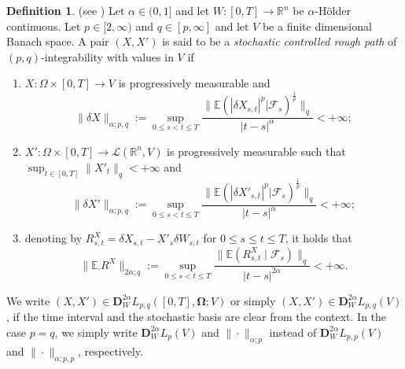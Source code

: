 \documentclass[10pt, a4paper]{article} %
\newcommand{\R}{\mathbb{R}}
\newcommand{\E}{\mathbb{E}}
\theoremstyle{definition}
\newtheorem{defn}{Definition}[section]
\theoremstyle{plain}
\begin{document}
\begin{defn} \label{def:stochasticcontrolledroughpath}
    (see \cite[Definition 3.1]{FHL21})
    Let $\alpha \in (0,1]$ and let $W:[0,T] \to \R^n$ be $\alpha$-H\"older continuous. Let $p \in [2,\infty)$ and $q \in [p,\infty]$ and let $V$ be a finite dimensional Banach space. A pair $(X,X')$ is said to be a \textit{stochastic controlled rough path} of $(p,q)$-integrability with values in $V$ if 
\begin{enumerate} \renewcommand{\labelenumi}{\roman{enumi})}
    \item $X:\Omega \times [0,T] \to V$ is progressively measurable and 
    \begin{equation*}
        \|\delta X\|_{\alpha;p,q} := \sup_{0\le s < t\le T} \frac{\|\E(|\delta X_{s,t}|^p|\mathcal{F}_s)^\frac{1}{p}\|_q}{|t-s|^\alpha} < +\infty;
    \end{equation*} 
    \item $X':\Omega \times [0,T] \to \mathscr{L}(\R^n,V)$ is progressively measurable such that $\sup_{t \in [0,T]} \|X'_t\|_q < +\infty$ and
    \begin{equation*}
        \|\delta X'\|_{\alpha;p,q} := \sup_{0\le s < t\le T} \frac{\|\E(|\delta X'_{s,t}|^p|\mathcal{F}_s)^\frac{1}{p}\|_q}{|t-s|^{\alpha}} < +\infty;
    \end{equation*}
    \item denoting by $R^X_{s,t}=\delta X_{s,t} - X'_s \delta W_{s,t} $ for $0 \le s \le t \le T$, it holds that 
    \begin{equation*}
        \|\E_\cdot R^X\|_{2\alpha;q}:=\sup_{0\le s < t \le T} \frac{\|\E(R^X_{s,t} \mid \mathcal{F}_s)\|_q}{|t-s|^{2\alpha}} < + \infty.
    \end{equation*} 
\end{enumerate}
We write $(X,X') \in \mathbf{D}_W^{2\alpha} L_{p,q}([0,T],\mathbf{\Omega};V)$ or simply $(X,X') \in \mathbf{D}_W^{2\alpha} L_{p,q}(V)$, if the time interval and the stochastic basis are clear from the context.
In the case $p=q$, we simply write $\mathbf{D}_W^{2\alpha} L_{p}(V)$ and $\|\cdot\|_{\alpha;p}$ instead of $\mathbf{D}_W^{2\alpha} L_{p,p}(V)$ and $\|\cdot\|_{\alpha;p,p}$, respectively.
\end{defn}
\end{document}
